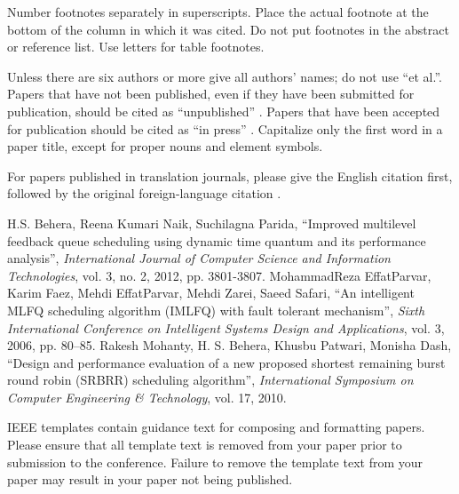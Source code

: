 \documentclass[conference]{IEEEtran}
\begin{document}
Number footnotes separately in superscripts. Place the actual footnote at 
the bottom of the column in which it was cited. Do not put footnotes in the 
abstract or reference list. Use letters for table footnotes.

Unless there are six authors or more give all authors' names; do not use 
``et al.''. Papers that have not been published, even if they have been 
submitted for publication, should be cited as ``unpublished'' \cite{b4}. Papers 
that have been accepted for publication should be cited as ``in press'' \cite{b5}. 
Capitalize only the first word in a paper title, except for proper nouns and 
element symbols.

For papers published in translation journals, please give the English 
citation first, followed by the original foreign-language citation \cite{b6}.

\begin{thebibliography}{00}
 H.S. Behera, Reena Kumari Naik, Suchilagna Parida, ``Improved multilevel feedback queue scheduling using dynamic time quantum and its performance analysis'', \textit{International Journal of Computer Science and Information Technologies}, vol. 3, no. 2, 2012, pp. 3801-3807.
 MohammadReza EffatParvar, Karim Faez, Mehdi EffatParvar, Mehdi Zarei, Saeed Safari, ``An intelligent MLFQ scheduling algorithm (IMLFQ) with fault tolerant mechanism'', \textit{Sixth International Conference on Intelligent Systems Design and Applications}, vol. 3, 2006, pp. 80–85.
 Rakesh Mohanty, H. S. Behera, Khusbu Patwari, Monisha Dash, ``Design and performance evaluation of a new proposed shortest remaining burst round robin (SRBRR) scheduling algorithm'', \textit{International Symposium on Computer Engineering \& Technology}, vol. 17, 2010.
\end{thebibliography}
\vspace{12pt}
\color{red}
IEEE templates contain guidance text for composing and formatting papers. Please ensure that all template text is removed from your paper prior to submission to the conference. Failure to remove the template text from your paper may result in your paper not being published.
\end{document}
